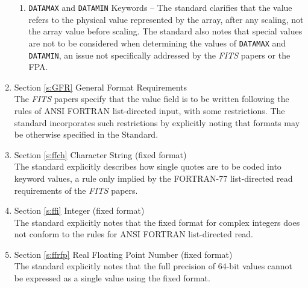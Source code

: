 \begin{enumerate}
\begin{enumerate}
 \item {\tt DATAMAX} and {\tt DATAMIN} Keywords -- The standard
     clarifies that the value refers to the 
     physical value 
     represented by the
     array, after any scaling, 
     not the array value before scaling.  
     The standard also notes that special
     values are not to be considered 
     when determining the values of {\tt DATAMAX} and {\tt DATAMIN}, 
     an issue not specifically addressed 
     by the {\em FITS\/} papers or the FPA. 

 \end{enumerate}
 
\item Section \ref{s:GFR} General Format Requirements\\
     The {\em FITS} papers specify that the value field is to be 
     written following the rules of 
     ANSI FORTRAN 
     list-directed
     input, with some restrictions.  The standard 
     incorporates such restrictions by explicitly noting that 
     formats may be otherwise specified in the Standard. 
 
\item Section \ref{s:ffch} Character String (fixed format)\\
     The standard explicitly 
     describes how single quotes are to be 
     coded into keyword values, a rule only implied by the 
     FORTRAN-77 list-directed
     read 
     requirements of the {\em FITS\/} papers.

\item Section \ref{s:ffi} Integer (fixed format)\\
     The standard explicitly notes that the fixed format 
     for complex integers 
     does not conform to the rules 
     for ANSI FORTRAN 
     list-directed read.

\item Section \ref{s:ffrfp} Real Floating Point Number (fixed 
     format)\\
     The standard explicitly notes that the full precision of 64-bit
     values cannot be expressed as a single value using the 
     fixed format. 


\end{enumerate}
